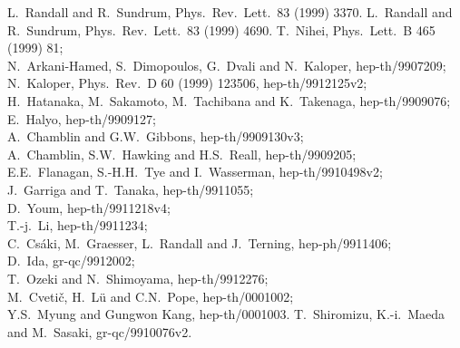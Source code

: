 \documentclass[12pt,fleqn]{article}
\begin{document}
\begin{thebibliography}{88} 
L.\ Randall and R.\ Sundrum, Phys.\ Rev.\ Lett.\ 83
  (1999) 3370. 
L.\ Randall and R.\ Sundrum, Phys.\ Rev.\ Lett.\ 83 
 (1999) 4690. 
T.\ Nihei, Phys.\ Lett.\ B  465 (1999) 81;\\
N.\ Arkani-Hamed, S.\ Dimopoulos, G.\ Dvali and N.\ Kaloper,
hep-th/9907209;\\
N.\ Kaloper, Phys.\ Rev.\ D 60 (1999) 123506, hep-th/9912125v2;\\
H.\ Hatanaka, M.\ Sakamoto, M.\ Tachibana and K.\ Takenaga,
hep-th/9909076;\\
E.\ Halyo, hep-th/9909127;\\
A.\ Chamblin and G.W.\ Gibbons, hep-th/9909130v3;\\
A.\ Chamblin, S.W.\ Hawking and H.S.\ Reall, hep-th/9909205;\\
E.E.\ Flanagan, S.-H.H.\ Tye and I.\ Wasserman, hep-th/9910498v2;\\
J.\ Garriga and T.\ Tanaka, hep-th/9911055;\\
D.\ Youm, hep-th/9911218v4;\\
T.-j.\ Li, hep-th/9911234;\\
C.\ Cs\'{a}ki, M.\ Graesser, L.\ Randall and J.\ Terning, hep-ph/9911406;\\
D.\ Ida, gr-qc/9912002;\\
T.\ Ozeki and N.\ Shimoyama, hep-th/9912276;\\
M.\ Cveti\v{c}, H.\ L\"u and C.N.\ Pope, hep-th/0001002;\\
Y.S.\ Myung and Gungwon Kang, hep-th/0001003.
T.\ Shiromizu, K.-i.\ Maeda and M.\ Sasaki, gr-qc/9910076v2. 
\end{thebibliography} 
\end{document}
